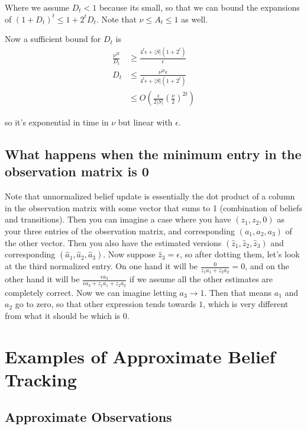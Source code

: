 \documentclass[10pt,english]{article}
\begin{document}
Where we assume $D_t<1$ because its small, so that we can bound the expansions of $(1+D_t)^t\leq 1+2^tD_t$. Note that $\nu \leq A_t \leq 1$ as well.

Now a sufficient bound for $D_t$ is
\begin{align}
\frac{\nu^{2t}}{D_t} &\geq \frac{4^t\epsilon + |S|(1+2^t)}{\epsilon} \\
D_t &\leq \frac{\nu^{2t}\epsilon}{4^t\epsilon+|S|(1+2^t)} \\
&\leq O\left( \frac{\epsilon}{2|S|}\left(\frac{\nu}{2}\right)^{2t} \right)
\end{align}

so it's exponential in time in $\nu$ but linear with $\epsilon$.

\subsection{What happens when the minimum entry in the observation matrix is 0}

Note that unnormalized belief update is essentially the dot product of a column in the observation matrix with some vector that sums to 1 (combination of beliefs and transitions). Then you can imagine a case where you have $(z_1, z_2, 0)$ as your three entries of the observation matrix, and corresponding $(a_1,a_2,a_3)$ of the other vector. Then you also have the estimated versions $(\widehat{z}_1,\widehat{z}_2,\widehat{z}_3)$ and corresponding $(\widehat{a}_1,\widehat{a}_2,\widehat{a}_3)$. Now suppose $\widehat{z}_3=\epsilon$, so after dotting them, let's look at the third normalized entry. On one hand it will be $\frac{0}{z_1a_1+z_2a_2}=0$, and on the other hand it will be $\frac{\epsilon a_3}{\epsilon a_3+z_1a_1+z_2a_2}$ if we assume all the other estimates are completely correct. Now we can imagine letting $a_3\rightarrow 1$. Then that means $a_1$ and $a_2$ go to zero, so that other expression tends towards $1$, which is very different from what it should be which is $0$.

\section{Examples of Approximate Belief Tracking}

\subsection{Approximate Observations}
\end{document}

